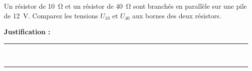 Un résistor de \qty{10}{\ohm} et un résistor de \qty{40}{\ohm} sont branchés en parallèle sur une pile de \qty{12}{V}. Comparez les tensions $U_{10}$ et $U_{40}$ aux bornes des deux résistors.

\choices

\noindent\textbf{Justification :} \hrulefill \\[2.5ex]
\rule{\linewidth}{0.4pt} \\[2.5ex]
\rule{\linewidth}{0.4pt}
\vfill
